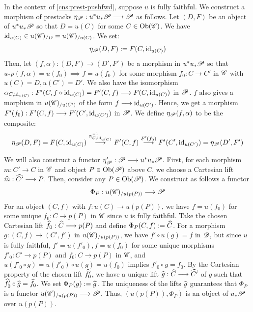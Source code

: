 \documentclass[11pt]{amsart}
\begin{document}
\begin{cns}\label{cns:unit-morphism}
In the context of \cref{cns:prest-pushfwd}, suppose $u$ is fully faithful.
We construct a morphism of prestacks $\eta_\sP : u^*u_*\sP \to \sP$ as
follows. Let $(D, F)$ be an object of $u^*u_*\mathscr{P}$ so that $D = u(C)$ for some $C \in \Ob{\sC}$.
We have $\mathrm{id}_{u(C)} \in u(\mathscr{C})_{/D} = u(\mathscr{C})_{/u(C)}$. We set:
\[
\eta_\mathscr{P}(D, F) := F(C, \mathrm{id}_{u(C)})
\]
Then, let $(f, \alpha) : (D, F) \to (D', F')$ be a morphism in $u^*u_*\mathscr{P}$ so that
$u_*p(f, \alpha) = u(f_0) \implies f= u(f_0)$ for some morphism $f_0 : C \to C'$ in $\mathscr{C}$ with
$u(C) = D, u(C') = D'$.
We also have the isomorphism
$\alpha_{C, \id_{u(C)}} : F'(C, f \circ \id_{u(C)}) = F'(C, f) \to F(C, \id_{u(C)})$
in $\mathscr{P}$. $f$ also gives a morphism in $u(\mathscr{C})_{/u(C')}$ of the form
$f \to \id_{u(C')}$. Hence, we get a morphism $F'(f_0) : F'(C, f) \to F'(C', \id_{u(C')})$ in $\mathscr{P}$.
We define $\eta_\mathscr{P}(f, \alpha)$ to be the composite:
\[
\eta_\sP(D, F) = F(C, \id_{u(C)})
\to[\alpha_{C, \id_{u(C)}}^{-1}] F'(C, f)
\to[F'(f_0)] F'(C', \id_{u(C')}) = \eta_\sP(D', F')
\]

We will also construct a functor $\eta'_\sP : \sP \to u^*u_*\sP$.
First, for each morphism $m : C' \to C$ in $\mathscr{C}$ and object $P \in \Ob{\sP}$ above $C$,
we choose a Cartesian lift $\wh{m} : \wh{C'} \to P$.
Then, consider any $P \in \Ob{\sP}$. We construct as follows a functor
\[
\Phi_P : u(\sC)_{/u(p(P))} \to \sP
\]
For an object $(C, f)$ with $f : u(C) \to u(p(P))$,
we have $f = u(f_0)$ for some unique $f_0 : C \to p(P)$ in $\mathscr{C}$ since $u$ is fully faithful.
Take the chosen Cartesian lift $\wh{f_0} : \wh{C} \to p(P)$ and define $\Phi_P(C, f) := \widehat{C}$.
For a morphism $g : (C, f) \to (C', f')$ in $u(\mathscr{C})_{/u(p(P))}$, we have $f' \circ u(g) = f$
in $\mathscr{D}$, but since $u$ is fully faithful, $f' = u(f'_0), f= u(f_0)$ for some unique morphisms
$f'_0 : C' \to p(P)$ and $f_0 : C \to p(P)$ in $\mathscr{C}$,
and $u(f'_0 \circ g) = u(f'_0) \circ u(g) = u(f_0)$ implies $f'_0 \circ g = f_0$.
By the Cartesian property of the chosen lift $\widehat{f'_0}$, we have a unique lift
$\wh{g} : \wh{C} \to \wh{C'}$ of $g$ such that $\widehat{f'_0} \circ \widehat{g} = \widehat{f_0}$.
We set $\Phi_P(g) := \widehat{g}$. The uniqueness of the lifts $\widehat{g}$ guarantees that
$\Phi_P$ is a functor $u(\sC)_{/u(p(P))} \to \sP$. Thus, $(u(p(P)), \Phi_P)$ is an object of
$u_*\mathscr{P}$ over $u(p(P))$.


\end{cns}
\end{document}
